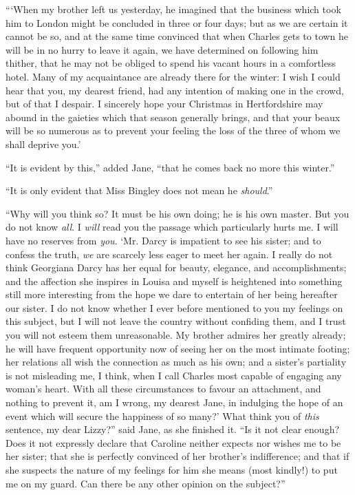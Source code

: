 \documentclass[12pt,openright]{book}
\begin{document}
“‘When my brother left us yesterday, he imagined that the business which took him to London might be concluded in three or four days; but as we are certain it cannot be so, and at the same time convinced that when Charles gets to town he will be in no hurry to leave it again, we have determined on following him thither, that he may not be obliged to spend his vacant hours in a comfortless hotel. Many of my acquaintance are already there for the winter: I wish I could hear that you, my dearest friend, had any intention of making one in the crowd, but of that I despair. I sincerely hope your Christmas in Hertfordshire may abound in the gaieties which that season generally brings, and that your beaux will be so numerous as to prevent your feeling the loss of the three of whom we shall deprive you.’

“It is evident by this,” added Jane, “that he comes back no more this winter.”

“It is only evident that Miss Bingley does not mean he \textit{should}.”

“Why will you think so? It must be his own doing; he is his own master. But you do not know \textit{all}. I \textit{will} read you the passage which particularly hurts me. I will have no reserves from \textit{you}. ‘Mr. Darcy is impatient to see his sister; and to confess the truth, \textit{we} are scarcely less eager to meet her again. I really do not think Georgiana Darcy has her equal for beauty, elegance, and accomplishments; and the affection she inspires in Louisa and myself is heightened into something still more interesting from the hope we dare to entertain of her being hereafter our sister. I do not know whether I ever before mentioned to you my feelings on this subject, but I will not leave the country without confiding them, and I trust you will not esteem them unreasonable. My brother admires her greatly already; he will have frequent opportunity now of seeing her on the most intimate footing; her relations all wish the connection as much as his own; and a sister’s partiality is not misleading me, I think, when I call Charles most capable of engaging any woman’s heart. With all these circumstances to favour an attachment, and nothing to prevent it, am I wrong, my dearest Jane, in indulging the hope of an event which will secure the happiness of so many?’ What think you of \textit{this} sentence, my dear Lizzy?” said Jane, as she finished it. “Is it not clear enough? Does it not expressly declare that Caroline neither expects nor wishes me to be her sister; that she is perfectly convinced of her brother’s indifference; and that if she suspects the nature of my feelings for him she means (most kindly!) to put me on my guard. Can there be any other opinion on the subject?”
\end{document}
